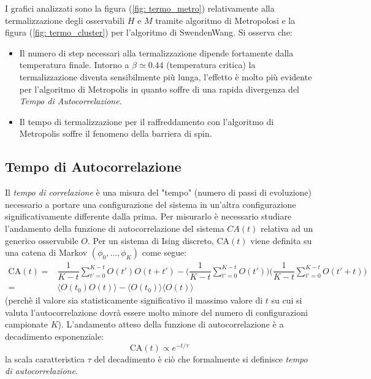 I grafici analizzati sono la figura (\ref{fig: termo_metro}) relativamente alla termalizzazione degli osservabili $H$ e $M$ tramite algoritmo di Metropolosi e la figura (\ref{fig: termo_cluster}) per l'algoritmo di SwendenWang.\newline
Si osserva che:
\begin{itemize}
\item Il numero di step necessari alla termalizzazione dipende fortamente dalla temperatura finale. Intorno a $\beta \simeq 0.44$ (temperatura critica) la termalizzazione diventa sensibilmente più lunga, l'effetto è molto più evidente per l'algoritmo di Metropolis in quanto soffre di una rapida divergenza del \emph{Tempo di Autocorrelazione}.
\item Il tempo di termalizzazione per il raffreddamento con l'algoritmo di Metropolis soffre il fenomeno della barriera di spin.
\end{itemize}

\subsection{Tempo di Autocorrelazione}
Il \emph{tempo di correlazione} è una misura del "tempo" (numero di passi di evoluzione) necessario a portare una configurazione del sistema in un'altra configurazione significativamente differente dalla prima.
Per misurarlo è necessario studiare l'andamento della funzione di autocorrelazione del sistema $CA(t)$ relativa ad un generico osservabile $O$.\newline
Per un sistema di Ising discreto, $\textrm{CA}(t)$ viene definita su una catena di Markov $(\phi_0, \ldots, \phi_{K} )$ come segue:
\begin{equation}
\begin{split}
\textrm{CA}(t) =& \dfrac{1}{K-t} \sum_{t'=0}^{K-t}O(t')O(t+t') - 
	  \biggr(\dfrac{1}{K-t}\sum_{t'=0}^{K-t}O(t')\biggr)
	  \biggr( \dfrac{1}{K - t}\sum_{t'=0}^{K-t}O(t'+t) \biggr) \\
	  =& \langle O(t_0)O(t)\rangle - \langle O(t_0) \rangle \langle O(t) \rangle
\end{split}
\end{equation}
(perchè il valore sia statisticamente significativo il massimo valore di $t$ su cui si valuta l'autocorrelazione dovrà essere molto minore del numero di configurazioni campionate $K$).\newline
L'andamento atteso della funzione di autocorrelazione è a decadimento esponenziale:
\begin{equation}
	\textrm{CA}(t) \propto e^{-t/\tau}
\end{equation}
la scala caratteristica $\tau$ del decadimento è ciò che formalmente si definisce \emph{tempo di autocorrelazione}.

